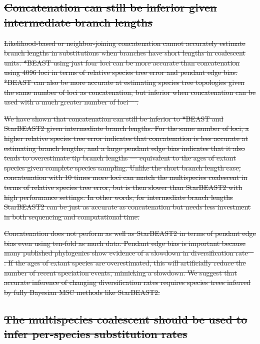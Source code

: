 \documentclass[12pt]{article}
\providecommand{\DIFdeltex}[1]{{\protect\color{red}\sout{#1}}}                      %
\providecommand{\DIFdel}[1]{\texorpdfstring{\DIFdeltex{#1}}{}} %
\begin{document}
\subsection{\DIFdel{Concatenation can still be inferior given intermediate branch lengths}}
\addtocounter{subsection}{-1}%

\DIFdel{Likelihood-based or neighbor-joining concatenation cannot accurately
estimate branch lengths in substitutions when branches have short lengths in coalescent units.
*BEAST using just four loci can be more accurate than
concatenation using 4096 loci in terms of relative species tree error and
pendant edge bias. *BEAST can also be more accurate at estimating species tree
topologies given the same number of loci as concatenation, but inferior when
concatenation can be used with a much greater number of loci
\mbox{%
\citep{Ogilvie01052016}}%
.
}%

\DIFdel{We have shown that concatenation can still be inferior to *BEAST and StarBEAST2
given intermediate branch lengths. For the same number of loci, a higher
relative species tree error indicates that concatenation is less accurate at
estimating branch lengths, and a large pendant edge bias indicates that
it also tends to overestimate tip branch lengths --- equivalent to the
ages of extant species given complete species sampling. Unlike the short branch
length case, concatenation with 10 times more loci can match the multispecies
coalescent in
terms of relative species tree error, but is then slower than StarBEAST2 with
high performance settings. In other words, for intermediate branch lengths
StarBEAST2 can be just as accurate as concatenation but needs less investment in
both sequencing and computational time.
}%

\DIFdel{Concatenation does not perform as well as StarBEAST2 in terms of pendant edge bias
even using ten-fold as much data.
Pendant edge bias is important because many published phylogenies show evidence
of a slowdown in diversification rate \mbox{%
\citep{Moen2014190}}%
. If the ages of extant
species are overestimated, this will artificially reduce the number of recent
speciation events, mimicking a slowdown. We suggest that accurate inference of
changing diversification rates requires species trees inferred by fully Bayesian MSC methods
like StarBEAST2.
}%

\subsection{\DIFdel{The multispecies coalescent should be used to infer per-species substitution rates}}
\addtocounter{subsection}{-1}%
\end{document}
